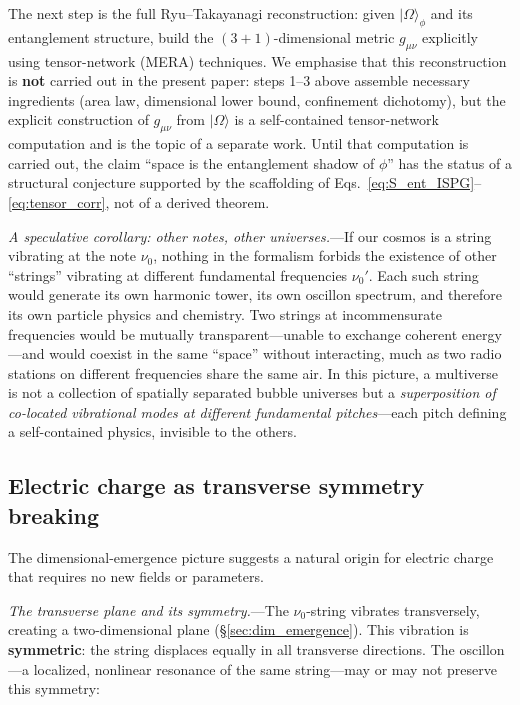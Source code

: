 \documentclass[11pt]{article}
\begin{document}
The next step is the full
Ryu--Takayanagi reconstruction: given
$|\Omega\rangle_\phi$ and its entanglement
structure, build the $(3{+}1)$-dimensional
metric $g_{\mu\nu}$ explicitly using
tensor-network (MERA) techniques.  We
emphasise that this reconstruction is
\textbf{not} carried out in the present
paper: steps 1--3 above assemble necessary
ingredients (area law, dimensional lower
bound, confinement dichotomy), but the
explicit construction of $g_{\mu\nu}$ from
$|\Omega\rangle$ is a self-contained
tensor-network computation and is the topic
of a separate work.  Until that computation
is carried out, the claim ``space is the
entanglement shadow of $\phi$'' has the
status of a structural conjecture supported
by the scaffolding of
Eqs.~\eqref{eq:S_ent_ISPG}--%
\eqref{eq:tensor_corr}, not of a derived
theorem.

\textit{A speculative corollary: other notes,
other universes.}---If our cosmos is a string
vibrating at the note $\nu_0$, nothing in the
formalism forbids the existence of other
``strings'' vibrating at different fundamental
frequencies $\nu_0'$.  Each such string would
generate its own harmonic tower, its own
oscillon spectrum, and therefore its own
particle physics and chemistry.  Two strings at
incommensurate frequencies would be mutually
transparent---unable to exchange coherent
energy---and would coexist in the same
``space'' without interacting, much as two
radio stations on different frequencies share
the same air.  In this picture, a multiverse
is not a collection of spatially separated
bubble universes but a \emph{superposition of
co-located vibrational modes at different
fundamental pitches}---each pitch defining a
self-contained physics, invisible to the
others.

\subsection{Electric charge as transverse
symmetry breaking}
\label{sec:charge}

The dimensional-emergence picture suggests a
natural origin for electric charge that requires
no new fields or parameters.

\textit{The transverse plane and its
symmetry.}---The $\nu_0$-string vibrates
transversely, creating a two-dimensional plane
(\S\ref{sec:dim_emergence}).  This vibration is
\textbf{symmetric}: the string displaces equally
in all transverse directions.  The oscillon---a
localized, nonlinear resonance of the same
string---may or may not preserve this symmetry:
\end{document}
